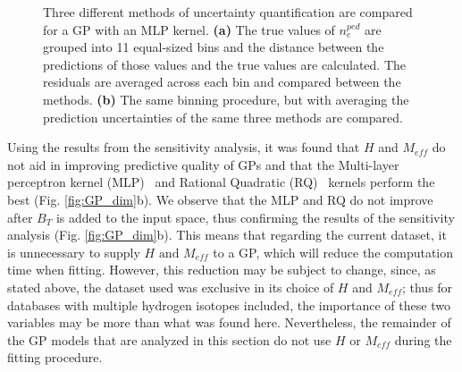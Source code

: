 \documentclass[a4paper, twoside, final, 12pt]{article}
\begin{document}
{\begin{figure}
\begin{subfigure}{0.48\linewidth}
		\caption{}
		\label{subfig:MLP_UQ}
	\end{subfigure}
	\caption{Three different methods of uncertainty quantification are compared for a GP with an MLP kernel. \textbf{(a)} The true values of $n_e^{ped}$ are grouped into 11 equal-sized bins and the distance between the predictions of those values and the true values are calculated. The residuals are averaged across each bin and compared between the methods. \textbf{(b)} The same binning procedure, but with averaging the prediction uncertainties of the same three methods are compared.}
	\label{fig:MLP_UQ}
\end{figure}


Using the results from the sensitivity analysis, it was found that $H$ and $M_{eff}$ do not aid in improving predictive quality of GPs and that the Multi-layer perceptron kernel (MLP)~\cite{gpy_MLP} and Rational Quadratic (RQ)~\cite{kernel_cookbook} kernels perform the best (Fig. \ref{fig:GP_dim}b).  We observe that the MLP and RQ do not improve after $B_T$ is added to the input space, thus confirming the results of the sensitivity analysis (Fig. \ref{fig:GP_dim}b). This means that regarding the current dataset, it is unnecessary to supply $H \text{ and } M_{eff}$ to a GP, which will reduce the computation time when fitting. However, this reduction may be subject to change, since, as stated above, the dataset used was exclusive in its choice of $H$ and $M_{eff}$; thus for databases with multiple hydrogen isotopes included, the importance of these two variables may be more than what was found here. Nevertheless, the remainder of the GP models that are analyzed in this section do not use $H$ or $M_{eff}$ during the fitting procedure. 

 

}
\end{document}
